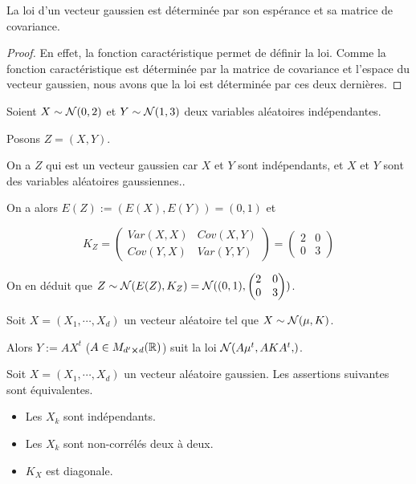 \begin{corollary}
	La loi d'un vecteur gaussien est déterminée par son espérance et sa matrice
	de covariance.
\end{corollary}

\ifdefined\outputproof
\begin{proof}
	En effet, la fonction caractéristique permet de définir la loi. Comme la
	fonction caractéristique est déterminée par la matrice de covariance et
	l'espace du vecteur gaussien, nous avons que la loi est déterminée par ces
	deux dernières.
\end{proof}

\begin{exemple}
	Soient $X \sim \mathcal{N}(0, 2)$ et $Y \sim \mathcal{N}(1, 3)$
	deux variables aléatoires indépendantes.

	Posons $Z = (X, Y)$.

	On a $Z$ qui est un vecteur gaussien car $X$ et $Y$ sont indépendants, et
	$X$ et $Y$ sont des variables aléatoires gaussiennes..

	On a alors $E(Z) := (E(X), E(Y)) = (0, 1)$ et

	\begin{equation}
		K_{Z} =
		\begin{pmatrix}
			Var(X, X) & Cov(X, Y) \\
			Cov(Y, X) & Var(Y, Y)
		\end{pmatrix}
		=
		\begin{pmatrix}
			2 & 0 \\
			0 & 3
		\end{pmatrix}
	\end{equation}

	On en déduit que $Z \sim \mathcal{N}(E(Z), K_{Z}) = \mathcal{N}((0,
	1), \begin{pmatrix}
			2 & 0 \\
			0 & 3
		\end{pmatrix}
	)$.
\end{exemple}

\begin{proposition}
	Soit $X = (X_{1}, \cdots, X_{d})$ un vecteur aléatoire tel que $X \sim
	\mathcal{N}(\mu, K)$.

	Alors $Y := A X^{t}$ ($A \in M_{d' \cross d}(\mathbb{R})$) suit la
	loi $\lawNormal{A \mu^{t},  A K A^{t}}$.
\end{proposition}

\begin{theorem}
	Soit $X = (X_{1}, \cdots, X_{d})$ un vecteur aléatoire gaussien.
	Les assertions suivantes sont équivalentes.

	\begin{itemize}
		\item Les $X_{k}$ sont indépendants.
		\item Les $X_{k}$ sont non-corrélés deux à deux.
		\item $K_{X}$ est diagonale.
	\end{itemize}
\end{theorem}

